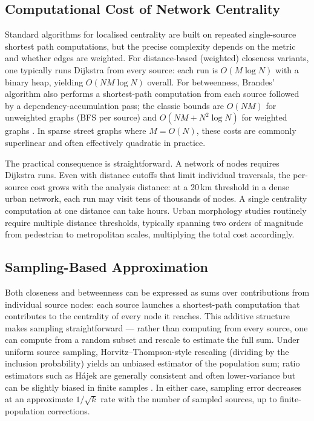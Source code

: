 
\subsection{Computational Cost of Network Centrality}

Standard algorithms for localised centrality are built on repeated single-source shortest path computations, but the precise complexity depends on the metric and whether edges are weighted. For distance-based (weighted) closeness variants, one typically runs Dijkstra from every source: each run is $O(M \log N)$ with a binary heap, yielding $O(NM \log N)$ overall. For betweenness, Brandes' algorithm also performs a shortest-path computation from each source followed by a dependency-accumulation pass; the classic bounds are $O(NM)$ for unweighted graphs (BFS per source) and $O(NM + N^2 \log N)$ for weighted graphs \citep{Brandes2001}. In sparse street graphs where $M=O(N)$, these costs are commonly superlinear and often effectively quadratic in practice.

The practical consequence is straightforward. A network of \glaNnodes{} nodes requires \glaNnodes{} Dijkstra runs. Even with distance cutoffs that limit individual traversals, the per-source cost grows with the analysis distance: at a 20\,km threshold in a dense urban network, each run may visit tens of thousands of nodes. A single centrality computation at one distance can take hours. Urban morphology studies routinely require multiple distance thresholds, typically spanning two orders of magnitude from pedestrian to metropolitan scales, multiplying the total cost accordingly.

\subsection{Sampling-Based Approximation}

Both closeness and betweenness can be expressed as sums over contributions from individual source nodes: each source launches a shortest-path computation that contributes to the centrality of every node it reaches. This additive structure makes sampling straightforward --- rather than computing from every source, one can compute from a random subset and rescale to estimate the full sum. Under uniform source sampling, Horvitz--Thompson-style rescaling (dividing by the inclusion probability) yields an unbiased estimator of the population sum; ratio estimators such as H\'{a}jek are generally consistent and often lower-variance but can be slightly biased in finite samples \citep{Cochran1977, Sarndal2003}. In either case, sampling error decreases at an approximate $1/\sqrt{k}$ rate with the number of sampled sources, up to finite-population corrections.

